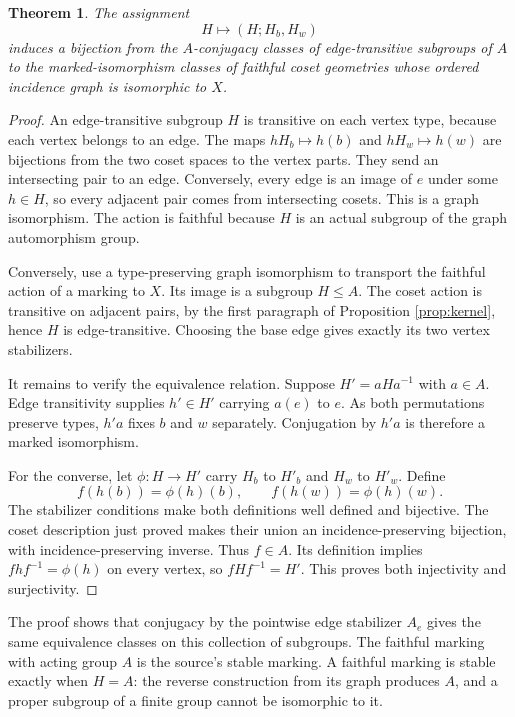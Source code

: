 \documentclass[11pt]{article}
\newtheorem{theorem}{Theorem}
\theoremstyle{definition}\newtheorem{definition}[theorem]{Definition}
\begin{document}
\begin{theorem}\label{thm:markings}
The assignment
\[
                  H\longmapsto(H;H_b,H_w)
\]
induces a bijection from the $A$-conjugacy classes of edge-transitive
subgroups of $A$ to the marked-isomorphism classes of faithful coset
geometries whose ordered incidence graph is isomorphic to $X$.
\end{theorem}
\begin{proof}
An edge-transitive subgroup $H$ is transitive on each vertex type,
because each vertex belongs to an edge.  The maps
$hH_b\mapsto h(b)$ and $hH_w\mapsto h(w)$ are bijections from
the two coset spaces to the vertex parts.  They send an intersecting
pair to an edge.  Conversely, every edge is an image of $e$ under
some $h\in H$, so every adjacent pair comes from intersecting cosets.
This is a graph isomorphism.  The action is faithful because $H$ is
an actual subgroup of the graph automorphism group.

Conversely, use a type-preserving graph isomorphism to transport the
faithful action of a marking to $X$.  Its image is a subgroup $H\le A$.
The coset action is transitive on adjacent pairs, by the first paragraph
of Proposition \ref{prop:kernel}, hence $H$ is edge-transitive.
Choosing the base edge gives exactly its two vertex stabilizers.

It remains to verify the equivalence relation.  Suppose
$H'=aHa^{-1}$ with $a\in A$.  Edge transitivity supplies $h'\in H'$
carrying $a(e)$ to $e$.  As both permutations preserve types, $h'a$
fixes $b$ and $w$ separately.  Conjugation by $h'a$ is therefore a
marked isomorphism.

For the converse, let $\phi:H\to H'$ carry $H_b$ to $H'_b$ and
$H_w$ to $H'_w$.  Define
\[
 f(h(b))=\phi(h)(b),\qquad f(h(w))=\phi(h)(w).
\]
The stabilizer conditions make both definitions well defined and
bijective.  The coset description just proved makes their union an
incidence-preserving bijection, with incidence-preserving inverse.
Thus $f\in A$.  Its definition implies $fhf^{-1}=\phi(h)$ on every
vertex, so $fHf^{-1}=H'$.  This proves both injectivity and surjectivity.
\end{proof}

The proof shows that conjugacy by the pointwise edge stabilizer $A_e$
gives the same equivalence classes on this collection of subgroups.
The faithful marking with acting group $A$ is the source's stable
marking.  A faithful marking is stable exactly when $H=A$: the
reverse construction from its graph produces $A$, and a proper
subgroup of a finite group cannot be isomorphic to it.
\end{document}
